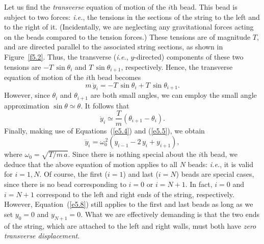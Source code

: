 Let us find the {\em transverse}\/ equation of motion of the $i$th bead. This
bead is subject to two forces: {\em i.e.}, the tensions in the sections
of the string to the left and to the right of it. (Incidentally, we are neglecting any gravitational forces
acting on the beads compared to the tension forces.) These tensions are of
magnitude $T$, and are directed parallel to the associated string sections, as shown
in Figure~\ref{f5.2}. Thus, the transverse ({\em i.e.}, $y$-directed) components of
these two tensions are $-T\,\sin\theta_i$  and $T\,\sin\theta_{i+1}$, respectively. 
Hence, the transverse equation of motion of the $i$th bead becomes
\begin{equation}
m\,\ddot{y}_i = -T\,\sin\theta_i + T\,\sin\theta_{i+1}.
\end{equation}
However, since $\theta_i$ and $\theta_{i+1}$ are both small angles, we
can employ the small angle approximation $\sin\theta\simeq \theta$. 
It follows that
\begin{equation}
\ddot{y}_i\simeq \frac{T}{m}\left(\theta_{i+1}-\theta_i\right).
\end{equation}
Finally, making use of Equations~(\ref{e5.4}) and (\ref{e5.5}),
we obtain
\begin{equation}\label{e5.8}
\ddot{y}_i = \omega_0^{\,2}\left(y_{i-1}-2\,y_i+y_{i+1}\right),
\end{equation}
where $\omega_0 = \sqrt{T/ m\,a}$. Since there is nothing special
about the $i$th bead, we deduce that the above equation of motion
applies to all $N$ beads: {\em i.e.}, it is valid for $i=1,N$. Of course,
the first ($i=1$) and last ($i=N$) beads are special cases, since there
is no bead corresponding to $i=0$ or $i=N+1$.  In fact, $i=0$ and $i=N+1$
correspond to the left and  right ends of the string, respectively. However,
Equation~(\ref{e5.8}) still applies to the first and last beads as long as
we set $y_0=0$ and $y_{N+1}=0$. What we are effectively demanding
 is that the two ends of the string, which are attached to the left and right walls, must both have {\em zero transverse
displacement}. 

